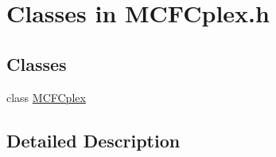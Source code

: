 \hypertarget{group___m_c_f_c_p_l_e_x___c_l_a_s_s_e_s}{}\section{Classes in M\+C\+F\+Cplex.\+h}
\label{group___m_c_f_c_p_l_e_x___c_l_a_s_s_e_s}
\subsection*{Classes}
\begin{DoxyCompactItemize}
\item 
class \mbox{\hyperlink{class_m_c_f_cplex}{M\+C\+F\+Cplex}}
\end{DoxyCompactItemize}


\subsection{Detailed Description}
